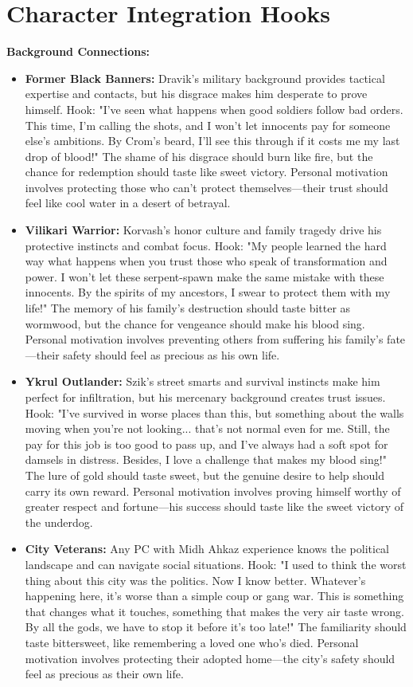 \documentclass[11pt]{article}
\begin{document}
\section{Character Integration Hooks}

\textbf{Background Connections:}
\begin{itemize}
\item \textbf{Former Black Banners:} Dravik's military background provides tactical expertise and contacts, but his disgrace makes him desperate to prove himself. Hook: "I've seen what happens when good soldiers follow bad orders. This time, I'm calling the shots, and I won't let innocents pay for someone else's ambitions. By Crom's beard, I'll see this through if it costs me my last drop of blood!" The shame of his disgrace should burn like fire, but the chance for redemption should taste like sweet victory. Personal motivation involves protecting those who can't protect themselves—their trust should feel like cool water in a desert of betrayal.
\item \textbf{Vilikari Warrior:} Korvash's honor culture and family tragedy drive his protective instincts and combat focus. Hook: "My people learned the hard way what happens when you trust those who speak of transformation and power. I won't let these serpent-spawn make the same mistake with these innocents. By the spirits of my ancestors, I swear to protect them with my life!" The memory of his family's destruction should taste bitter as wormwood, but the chance for vengeance should make his blood sing. Personal motivation involves preventing others from suffering his family's fate—their safety should feel as precious as his own life.
\item \textbf{Ykrul Outlander:} Szik's street smarts and survival instincts make him perfect for infiltration, but his mercenary background creates trust issues. Hook: "I've survived in worse places than this, but something about the walls moving when you're not looking... that's not normal even for me. Still, the pay for this job is too good to pass up, and I've always had a soft spot for damsels in distress. Besides, I love a challenge that makes my blood sing!" The lure of gold should taste sweet, but the genuine desire to help should carry its own reward. Personal motivation involves proving himself worthy of greater respect and fortune—his success should taste like the sweet victory of the underdog.
\item \textbf{City Veterans:} Any PC with Midh Ahkaz experience knows the political landscape and can navigate social situations. Hook: "I used to think the worst thing about this city was the politics. Now I know better. Whatever's happening here, it's worse than a simple coup or gang war. This is something that changes what it touches, something that makes the very air taste wrong. By all the gods, we have to stop it before it's too late!" The familiarity should taste bittersweet, like remembering a loved one who's died. Personal motivation involves protecting their adopted home—the city's safety should feel as precious as their own life.

\end{itemize}
\end{document}
